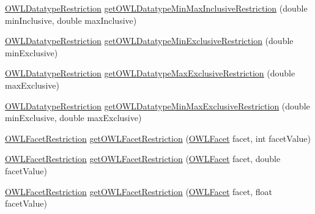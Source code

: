 \begin{DoxyCompactItemize}
\item 
\hyperlink{interfaceorg_1_1semanticweb_1_1owlapi_1_1model_1_1_o_w_l_datatype_restriction}{O\-W\-L\-Datatype\-Restriction} \hyperlink{classuk_1_1ac_1_1manchester_1_1cs_1_1owl_1_1owlapi_1_1_o_w_l_data_factory_impl_a91080bca661ef449b235d9d47ace5fab}{get\-O\-W\-L\-Datatype\-Min\-Max\-Inclusive\-Restriction} (double min\-Inclusive, double max\-Inclusive)
\item 
\hyperlink{interfaceorg_1_1semanticweb_1_1owlapi_1_1model_1_1_o_w_l_datatype_restriction}{O\-W\-L\-Datatype\-Restriction} \hyperlink{classuk_1_1ac_1_1manchester_1_1cs_1_1owl_1_1owlapi_1_1_o_w_l_data_factory_impl_a939cfbb22fe18a224ef0ab52d957800e}{get\-O\-W\-L\-Datatype\-Min\-Exclusive\-Restriction} (double min\-Exclusive)
\item 
\hyperlink{interfaceorg_1_1semanticweb_1_1owlapi_1_1model_1_1_o_w_l_datatype_restriction}{O\-W\-L\-Datatype\-Restriction} \hyperlink{classuk_1_1ac_1_1manchester_1_1cs_1_1owl_1_1owlapi_1_1_o_w_l_data_factory_impl_a0784c01ad177482e8f7aca8513053251}{get\-O\-W\-L\-Datatype\-Max\-Exclusive\-Restriction} (double max\-Exclusive)
\item 
\hyperlink{interfaceorg_1_1semanticweb_1_1owlapi_1_1model_1_1_o_w_l_datatype_restriction}{O\-W\-L\-Datatype\-Restriction} \hyperlink{classuk_1_1ac_1_1manchester_1_1cs_1_1owl_1_1owlapi_1_1_o_w_l_data_factory_impl_a3af3d19397d43dbe105c267d97933a0e}{get\-O\-W\-L\-Datatype\-Min\-Max\-Exclusive\-Restriction} (double min\-Exclusive, double max\-Exclusive)
\item 
\hyperlink{interfaceorg_1_1semanticweb_1_1owlapi_1_1model_1_1_o_w_l_facet_restriction}{O\-W\-L\-Facet\-Restriction} \hyperlink{classuk_1_1ac_1_1manchester_1_1cs_1_1owl_1_1owlapi_1_1_o_w_l_data_factory_impl_acd37111a59f95d347fec254686d9ac63}{get\-O\-W\-L\-Facet\-Restriction} (\hyperlink{enumorg_1_1semanticweb_1_1owlapi_1_1vocab_1_1_o_w_l_facet}{O\-W\-L\-Facet} facet, int facet\-Value)
\item 
\hyperlink{interfaceorg_1_1semanticweb_1_1owlapi_1_1model_1_1_o_w_l_facet_restriction}{O\-W\-L\-Facet\-Restriction} \hyperlink{classuk_1_1ac_1_1manchester_1_1cs_1_1owl_1_1owlapi_1_1_o_w_l_data_factory_impl_a18588172f4afb72568f9aa2d1bc368d3}{get\-O\-W\-L\-Facet\-Restriction} (\hyperlink{enumorg_1_1semanticweb_1_1owlapi_1_1vocab_1_1_o_w_l_facet}{O\-W\-L\-Facet} facet, double facet\-Value)
\item 
\hyperlink{interfaceorg_1_1semanticweb_1_1owlapi_1_1model_1_1_o_w_l_facet_restriction}{O\-W\-L\-Facet\-Restriction} \hyperlink{classuk_1_1ac_1_1manchester_1_1cs_1_1owl_1_1owlapi_1_1_o_w_l_data_factory_impl_a82aeb93722d10c11f407da95c842206a}{get\-O\-W\-L\-Facet\-Restriction} (\hyperlink{enumorg_1_1semanticweb_1_1owlapi_1_1vocab_1_1_o_w_l_facet}{O\-W\-L\-Facet} facet, float facet\-Value)

\end{DoxyCompactItemize}
